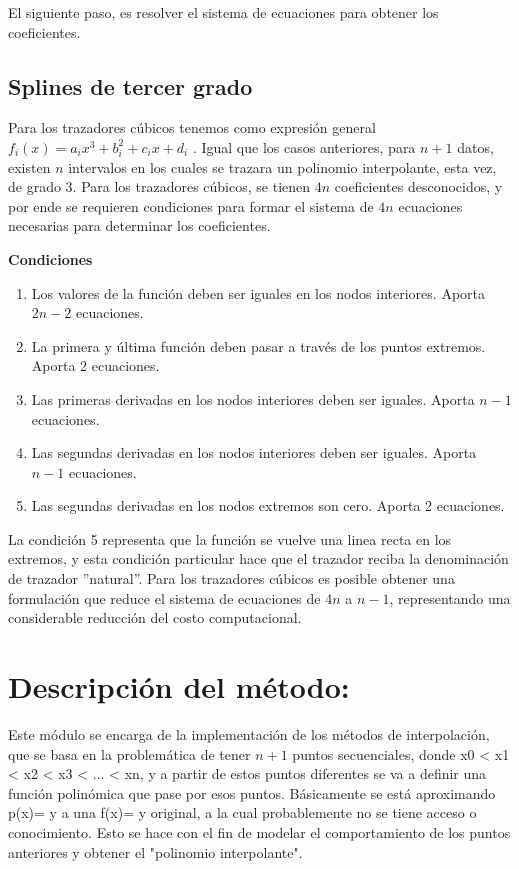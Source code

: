 \documentclass[letterpaper,10pt,oneside]{sphinxmanual}
\theoremstyle{plain}%
\theoremstyle{definition}%
\theoremstyle{remark}%
\begin{document}
El siguiente paso, es resolver el sistema de ecuaciones para obtener los coeficientes.

\subsection{Splines de tercer grado}

Para los trazadores cúbicos tenemos como expresión general $f_i(x) = a_ix^
3 +
b^
2_
i + c_ix + d_i$
. Igual que los casos anteriores, para $n + 1$ datos, existen $n$ intervalos
en los cuales se trazara un polinomio interpolante, esta vez, de grado $3$. Para los
trazadores cúbicos, se tienen $4n$ coeficientes desconocidos, y por ende se requieren
condiciones para formar el sistema de $4n$ ecuaciones necesarias para determinar
los coeficientes.

\textbf{Condiciones}

\begin{enumerate}
	\item Los valores de la función deben ser iguales en los nodos interiores. Aporta $2n-2$ ecuaciones.
	\item La primera y última función deben pasar a través de los puntos extremos. Aporta 2 ecuaciones.
	\item Las primeras derivadas en los nodos interiores deben ser iguales. Aporta $n-1$ecuaciones.
	\item Las segundas derivadas en los nodos interiores deben ser iguales. Aporta $n-1$ ecuaciones.
	\item Las segundas derivadas en los nodos extremos son cero. Aporta 2 ecuaciones.
\end{enumerate}

La condición 5 representa que la función se vuelve una linea recta en los extremos,
y esta condición particular hace que el trazador reciba la denominación de trazador
”natural”. Para los trazadores cúbicos es posible obtener una formulación que reduce el
sistema de ecuaciones de $4n$ a $n-1$, representando una considerable reducción
del costo computacional.

\section{Descripción del método:}
\label{chapter02:descripcion-del-metodo}

Este módulo se encarga de la implementación de los métodos de interpolación, que se basa en la problemática de tener $n+1$ puntos secuenciales,
donde x0 \textless{} x1 \textless{} x2 \textless{} x3 \textless{} ... \textless{} xn, y a partir de estos puntos diferentes se va a definir una función polinómica que pase por esos puntos.
Básicamente se está aproximando p(x)= y a una f(x)= y original, a la cual probablemente no se tiene acceso o conocimiento. Esto se hace con el fin
de modelar el comportamiento de los puntos anteriores y obtener el "polinomio interpolante".
\end{document}
